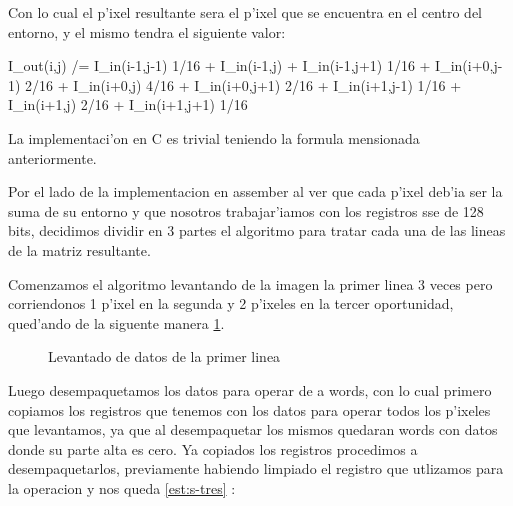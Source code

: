 Con lo cual el p'ixel resultante sera el p'ixel que se encuentra en el centro del entorno, y el mismo tendra el siguiente valor:

I_out(i,j) /= I_{in}(i-1,j-1) \cdot{} 1/16 + I_{in}(i-1,j) + I_{in}(i-1,j+1) \cdot{} 1/16 + I_{in}(i+0,j-1) \cdot{} 2/16 + I_{in}(i+0,j) \cdot{} 4/16 +  I_{in}(i+0,j+1) \cdot{} 2/16 + I_{in}(i+1,j-1) \cdot{} 1/16 + I_{in}(i+1,j) \cdot{} 2/16 + I_{in}(i+1,j+1) \cdot{} 1/16

La implementaci'on en C es trivial teniendo la formula mensionada anteriormente.

Por el lado de la implementacion en assember al ver que cada p'ixel deb'ia ser la suma de su entorno y que nosotros trabajar'iamos con los registros sse de 128 bits, decidimos 
dividir en 3 partes el algoritmo para tratar cada una de las lineas de la matriz resultante.

Comenzamos el algoritmo levantando de la imagen la primer linea 3 veces pero corriendonos 1 p'ixel en la segunda y 2 p'ixeles en la 
tercer oportunidad, qued'ando de la siguente manera \ref{est:s-dos}.

\begin{figure}[h!]
\caption{Levantado de datos de la primer linea}
\label{est:s-dos}
\end{figure}

Luego desempaquetamos los datos para operar de a words, con lo cual primero copiamos los registros que tenemos con los datos para operar todos los p'ixeles que levantamos, ya que al desempaquetar los mismos quedaran words con datos donde su parte alta es cero.
Ya copiados los registros procedimos a desempaquetarlos, previamente habiendo limpiado el registro que utlizamos para la operacion y nos queda \ref{est:s-tres} :

